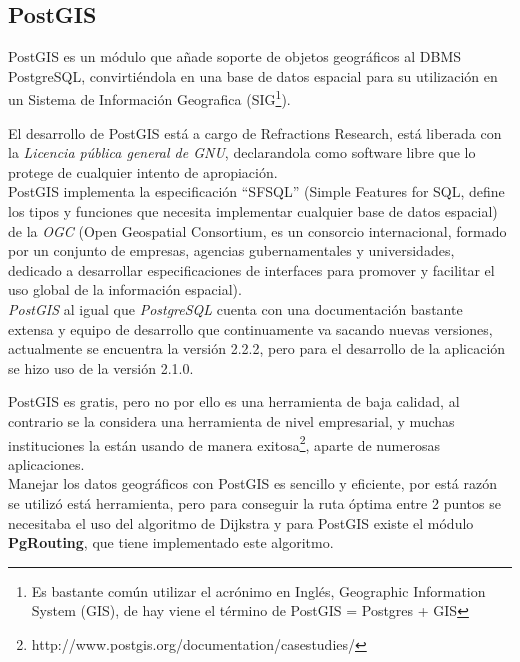 
    \subsection{PostGIS} %
    \label{sec:postgis}

      PostGIS es un módulo  que a\~nade soporte de objetos geográficos al DBMS PostgreSQL, convirtiéndola en una base de datos espacial para su utilización en un Sistema de Informaci\'on Geografica (SIG\footnote{ Es bastante común utilizar el acrónimo en Inglés, Geographic Information System (GIS), de hay viene el término de PostGIS = Postgres + GIS}).

      El desarrollo de PostGIS está a cargo de Refractions Research, está liberada con la \emph{Licencia pública general de GNU}, declarandola como software libre que lo protege de cualquier intento de apropiaci\'on.\\

      PostGIS implementa la especificaci\'on ``SFSQL'' (Simple Features for SQL, define los tipos y funciones que necesita implementar cualquier base de datos espacial) de la \emph{OGC} (Open Geospatial Consortium, es un consorcio internacional, formado por un conjunto de empresas, agencias gubernamentales y universidades, dedicado a desarrollar especificaciones de interfaces para promover y facilitar el uso global de la información espacial).\\

      \emph{PostGIS} al igual que \emph{PostgreSQL} cuenta con una documentaci\'on bastante extensa y equipo de desarrollo que continuamente va sacando nuevas versiones, actualmente se encuentra la versi\'on 2.2.2, pero para el desarrollo de la aplicaci\'on se hizo uso de la versi\'on 2.1.0.

      PostGIS es gratis, pero no por ello es una herramienta de baja calidad, al contrario se la considera una herramienta de nivel empresarial, y muchas instituciones la est\'an usando de manera exitosa\footnote{ http://www.postgis.org/documentation/casestudies/}, aparte de numerosas aplicaciones.\\

      Manejar los datos geográficos con PostGIS es sencillo y eficiente, por está raz\'on se utilizó está herramienta, pero para conseguir la ruta óptima entre 2 puntos se necesitaba el uso del algoritmo de Dijkstra y para PostGIS existe el módulo \textbf{PgRouting}, que tiene implementado este algoritmo.


